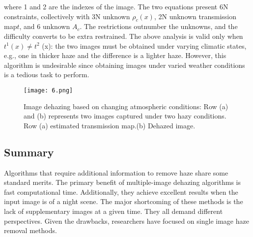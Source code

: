 \documentclass[doctor,english,listoffigures,listoftables]{thesis-uestc}
\begin{document}
where 1 and 2 are the indexes of the image. The two equations present 6N constraints, collectively with 3N unknown $\rho_c(x)$, 2N unknown transmission map$t$, and 6 unknown $A_c$. The restrictions outnumber the unknowns, and the difficulty converts to be extra restrained. The above analysis is valid only when $t^1 (x) \neq t^2$ (x): the two images must be obtained under varying climatic states, e.g., one in thicker haze and the difference is a lighter haze. However, this algorithm is undesirable since obtaining images under varied weather conditions is a tedious task to perform.
 
\begin{figure}[H]
	\centering
	\texttt{[image: 6.png]}
	\caption{Image dehazing based on changing atmospheric conditions: Row (a) and (b) represents two images captured under two hazy conditions. Row (a) estimated transmission map.(b) Dehazed image.}
	\label{fig6}
\end{figure}
\subsection{Summary }
Algorithms that require additional information to remove haze share some standard merits. The primary benefit of multiple-image dehazing algorithms is fast computational time. Additionally, they achieve excellent results when the input image is of a night scene. The major shortcoming of these methods is the lack of supplementary images at a given time. They all demand different perspectives. Given the drawbacks, researchers have focused on single image haze removal methods. 
\end{document}
